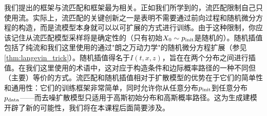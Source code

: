 我们提出的框架与流匹配和框架最为相关。正如我们所学到的，流匹配限制自己只使用流。实际上，流匹配的关键创新之一是表明不需要通过前向过程和随机微分方程的构造，而是流模型本身就可以以可扩展的方式进行训练。由于这种限制，你应该记住从流匹配模型采样将是确定性的（只有初始$X_0\sim p_{\rm{init}}$是随机的）。随机插值包括了纯流和我们这里使用的通过"朗之万动力学"的随机微分方程扩展（参见\cref{thm:langevin_trick}）。随机插值得名于$I(t,x,z)$，旨在在两个分布之间进行插值。在我们这里使用的术语中，这对应于构造条件和边际概率路径的一种不同但（主要）等价的方式。流匹配和随机插值相对于扩散模型的优势在于它们的简单性和通用性：它们的训练框架非常简单，同时允许你从任意分布$p_{\rm{init}}$到任意分布$p_{\rm{data}}$——而去噪扩散模型只适用于高斯初始分布和高斯概率路径。这为生成建模开辟了新的可能性，我们将在本课程后面简要涉及。


